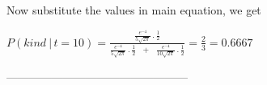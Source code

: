 \documentclass[12pt]{article}
\begin{document}
        Now substitute the values in main equation, we get
        
        \begin{center}
        \Large
        $P(kind\ | \,t = 10) = \frac{\frac{e^{-4}}{5\sqrt{2\pi}}\,.\,\frac{1}{2}}{\frac{e^{-4}}{5\sqrt{2\pi}}\,.\,\frac{1}{2}\,\,\,\,+\,\,\,\,\frac{e^{-4}}{10\sqrt{2\pi}}\,.\,\frac{1}{2}}  = \frac{2}{3} = 0.6667\ $
        \normalsize
        \end{center}

 ------------------------------------------------
 
\end{document}
